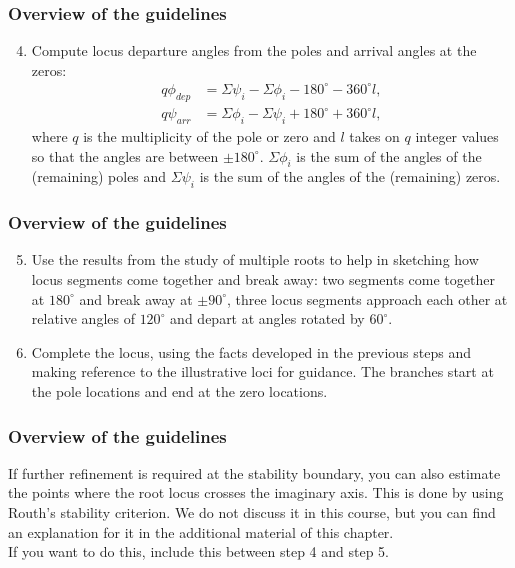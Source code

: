 \begin{frame}
	\frametitle{Overview of the guidelines}
	\begin{block}{}
		\begin{enumerate}
			\setcounter{enumi}{3}
			\item Compute locus departure angles from the poles and arrival angles at the zeros:
			\begin{align*}
			q\phi_{dep} &= \varSigma\psi_i - \varSigma\phi_i - 180^{\circ} - 360^{\circ}l,\\
			q\psi_{arr} &= \varSigma\phi_i - \varSigma\psi_i + 180^{\circ} + 360^{\circ}l,
			\end{align*}
			where $q$ is the multiplicity of the pole or zero and $l$ takes on $q$ integer values so that the angles are between $\pm180^{\circ}$. $\Sigma \phi_i$ is the sum of the angles of the (remaining) poles and $\Sigma \psi_i$ is the sum of the angles of the (remaining) zeros.
		\end{enumerate}
	\end{block}
\end{frame}

\begin{frame}
	\frametitle{Overview of the guidelines}
	\begin{block}{}
		\begin{enumerate}
			\setcounter{enumi}{4}
			\item Use the results from the study of multiple roots to help in sketching how locus segments come together and break away: two segments come together at $180^{\circ}$ and break away at $\pm 90^{\circ}$, three locus segments approach each other at relative angles of $120^{\circ}$ and depart at angles rotated by $60^{\circ}$.
			\item Complete the locus, using the facts developed in the previous steps and making reference to the illustrative loci for guidance. The branches start at the pole locations and end at the zero locations.
		\end{enumerate}
	\end{block}
\end{frame}

\begin{frame}
\frametitle{Overview of the guidelines}
	\justify
		If further refinement is required at the stability boundary, you can also estimate the points where the root locus crosses the imaginary axis. This is done by using Routh's stability criterion. We do not discuss it in this course, but you can find an explanation for it in the additional material of this chapter.\\
		\vspace{1em}
		If you want to do this, include this between step 4 and step 5.
\end{frame}

